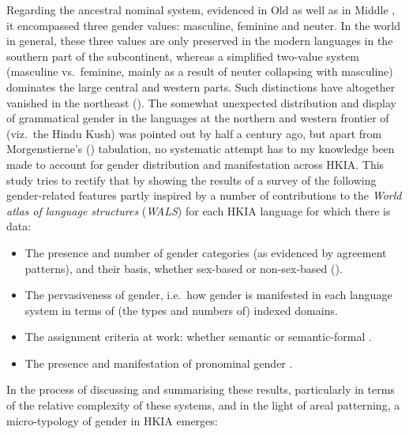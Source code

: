 \documentclass[output=collectionpaper]{langsci/langscibook}
\begin{document}
Regarding the ancestral nominal system, evidenced in Old  as well as in Middle , it encompassed three gender values: masculine, feminine and neuter. In the  world in general, these three values are only preserved in the modern languages in the southern part of the subcontinent, whereas a simplified two-value system (masculine vs.\ feminine, mainly as a result of neuter collapsing with masculine) dominates the large central and western parts. Such distinctions have altogether vanished in the northeast (\citealt[217--223]{Masica1991}). The somewhat unexpected distribution and display of grammatical gender in the languages at the northern and western frontier of  (viz.\ the Hindu Kush) was pointed out by \citet[68--71]{Emeneau1965} half a century ago, but apart from Morgenstierne's (\citeyear[19--20]{Morgenstierne1950}) tabulation, no systematic attempt has to my knowledge been made to account for gender distribution and manifestation across HKIA. This study tries to rectify that by showing the results of a survey of the following gender-related features \textendash{} partly inspired by a number of contributions to the \textit{World atlas of language structures} (\textit{WALS}) \textendash{} for each HKIA language for which there is data:

\begin{itemize}
\item
The presence and number of gender categories (as evidenced by agreement patterns), and their basis, whether sex-based or non-sex-based (\citealt{Corbett2013,Corbett2013a}).
\item
The pervasiveness of gender, i.e.\ how gender is manifested in each language system in terms of (the types and numbers of) indexed domains.
\item
The assignment criteria at work: whether semantic or semantic-formal \citep{Corbett2013b}.
\item
The presence and manifestation of pronominal gender \citep{Siewierska2013}.
\end{itemize}

In the process of discussing and summarising these results, particularly in terms of the relative complexity of these systems, and in the light of areal patterning, a micro-typology of gender in HKIA emerges:
\end{document}
